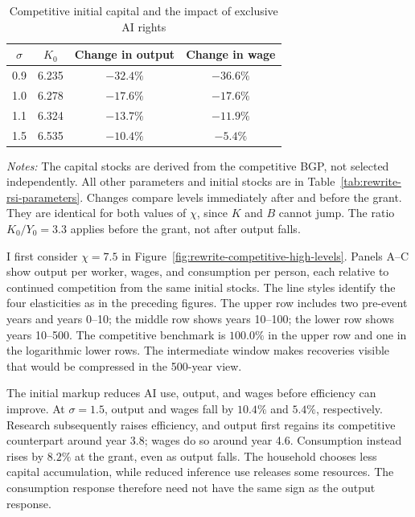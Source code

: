 \begin{table}[H]
 \centering
 \caption{Competitive initial capital and the impact of exclusive AI rights}
 \label{tab:rewrite-competitive-transition}
 \small{}
 \begin{tabular}{cccc}
 \toprule
 $\sigma$ & $K_0$ & Change in output & Change in wage\\
 \midrule
 0.9 & 6.235 & $-32.4\%$ & $-36.6\%$\\
 1.0 & 6.278 & $-17.6\%$ & $-17.6\%$\\
 1.1 & 6.324 & $-13.7\%$ & $-11.9\%$\\
 1.5 & 6.535 & $-10.4\%$ & $-5.4\%$\\
 \bottomrule
 \end{tabular}
 \par\vspace{4pt}
 \parbox{0.95\textwidth}{\footnotesize\emph{Notes:} The capital stocks are
 derived from the competitive BGP, not selected independently. All other
 parameters and initial stocks are in Table~\ref{tab:rewrite-rsi-parameters}.
 Changes compare levels immediately after and before the grant. They are
 identical for both values of $\chi$, since $K$ and $B$ cannot jump.
 The ratio $K_0/Y_0=3.3$ applies before the grant, not after output falls.}
\end{table}

I first consider $\chi=7.5$ in
Figure~\ref{fig:rewrite-competitive-high-levels}. Panels A--C show output
per worker, wages, and consumption per person, each relative to continued
competition from the same initial stocks. The line styles identify the
four elasticities as in the preceding figures. The upper row includes
two pre-event years and years 0--10; the middle row shows years 10--100;
the lower row shows years 10--500. The competitive benchmark is
$100.0\%$ in the upper row and one in the logarithmic lower rows.
The intermediate window makes recoveries visible that would be
compressed in the 500-year view.

The initial markup reduces AI use, output, and wages before efficiency
can improve. At $\sigma=1.5$, output and wages fall by $10.4\%$ and
$5.4\%$, respectively. Research subsequently raises efficiency, and
output first regains its competitive counterpart around year 3.8;
wages do so around year 4.6. Consumption instead rises by $8.2\%$ at
the grant, even as output falls. The household chooses less capital
accumulation, while reduced inference use releases some resources.
The consumption response therefore need not have the same sign as the
output response.

